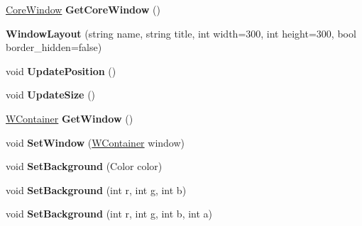 \begin{DoxyCompactItemize}
\item 
\mbox{\label{class_space_v_i_l_1_1_window_layout_af6094d36d89d5f4a50281cc3e5bd934d}} 
\mbox{\hyperlink{class_space_v_i_l_1_1_core_window}{Core\+Window}} {\bfseries Get\+Core\+Window} ()
\item 
\mbox{\label{class_space_v_i_l_1_1_window_layout_ac67233aa1cac7618ea6c8802b3478382}} 
{\bfseries Window\+Layout} (string name, string title, int width=300, int height=300, bool border\+\_\+hidden=false)
\item 
\mbox{\label{class_space_v_i_l_1_1_window_layout_a637fc8c9d1b5a3af28eaf7422cafcd6e}} 
void {\bfseries Update\+Position} ()
\item 
\mbox{\label{class_space_v_i_l_1_1_window_layout_af13e1e0544bcaefaaeaa123fd9dc0b52}} 
void {\bfseries Update\+Size} ()
\item 
\mbox{\label{class_space_v_i_l_1_1_window_layout_a39c5056a441bf4c532753a3cec4ad082}} 
\mbox{\hyperlink{class_space_v_i_l_1_1_w_container}{W\+Container}} {\bfseries Get\+Window} ()
\item 
\mbox{\label{class_space_v_i_l_1_1_window_layout_afcbdf9b8a212d3eeddfd3243e3d4b3a8}} 
void {\bfseries Set\+Window} (\mbox{\hyperlink{class_space_v_i_l_1_1_w_container}{W\+Container}} window)
\item 
\mbox{\label{class_space_v_i_l_1_1_window_layout_a6bc39ce349b7a492b57b785647c9b6d7}} 
void {\bfseries Set\+Background} (Color color)
\item 
\mbox{\label{class_space_v_i_l_1_1_window_layout_a14ad68ce6ef1034e7e1844c2daaf0afa}} 
void {\bfseries Set\+Background} (int r, int g, int b)
\item 
\mbox{\label{class_space_v_i_l_1_1_window_layout_af89bbb3b46585a8e8f1468ab0421ab2e}} 
void {\bfseries Set\+Background} (int r, int g, int b, int a)

\end{DoxyCompactItemize}
